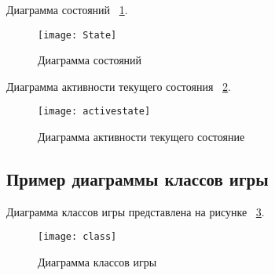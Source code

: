Диаграмма состояний ~\ref{State:image}.
\begin{figure}[ht]
	\texttt{[image: State]}
	\caption{Диаграмма состояний}
	\label{State:image}
\end{figure}

Диаграмма активности текущего состояния ~\ref{activestate:image}.
\begin{figure}[ht]
	\texttt{[image: activestate]}
	\caption{Диаграмма активности текущего состояние}
	\label{activestate:image}
\end{figure}
		
				
\subsection{Пример диаграммы классов игры}

Диаграмма классов игры представлена на рисунке ~\ref{class:image}.
\begin{figure}[ht]
	\texttt{[image: class]}
	\caption{Диаграмма классов игры}
	\label{class:image}
\end{figure}

 
